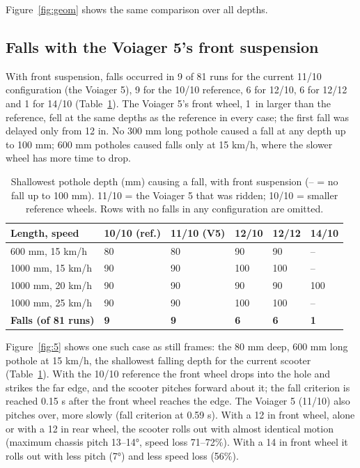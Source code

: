 Figure~\ref{fig:geom} shows the same comparison over all depths.

\subsection{Falls with the Voiager 5's front suspension}\label{falls-with-the-voiager-5s-front-suspension}


With front suspension, falls occurred in 9 of 81 runs for the current 11/10
configuration (the Voiager 5), 9 for the 10/10 reference, 6 for 12/10, 6 for 12/12 and 1
for 14/10 (Table~\ref{tab:7}). The Voiager 5's front wheel, 1~in larger than the reference,
fell at the same depths as the reference in every case; the first fall was delayed only
from 12 in. No 300 mm long pothole caused a fall at any depth up to 100 mm; 600 mm
potholes caused falls only at 15 km/h, where the slower wheel has more time to drop.

\begin{table}[htbp]
\centering
\caption{Shallowest pothole depth (mm) causing a fall, with front suspension (-- = no fall up to 100 mm). 11/10 = the Voiager 5 that was ridden; 10/10 = smaller reference wheels. Rows with no falls in any configuration are omitted.}\label{tab:7}
\begin{tabular}{@{}llllll@{}}
\toprule
Length, speed & 10/10 (ref.) & 11/10 (V5) & 12/10 & 12/12 & 14/10 \\
\midrule
600 mm, 15 km/h & 80 & 80 & 90 & 90 & -- \\
1000 mm, 15 km/h & 90 & 90 & 100 & 100 & -- \\
1000 mm, 20 km/h & 90 & 90 & 90 & 90 & 100 \\
1000 mm, 25 km/h & 90 & 90 & 100 & 100 & -- \\
\textbf{Falls (of 81 runs)} & \textbf{9} & \textbf{9} & \textbf{6} & \textbf{6} & \textbf{1} \\
\bottomrule
\end{tabular}
\end{table}


Figure~\ref{fig:5} shows one such case as still frames: the 80 mm deep, 600 mm long pothole at
15 km/h, the shallowest falling depth for the current scooter (Table~\ref{tab:7}). With the
10/10 reference the front wheel drops into the hole and strikes the far edge, and the
scooter pitches forward about it; the fall criterion is reached 0.15 s after the front
wheel reaches the edge. The Voiager 5 (11/10) also pitches over, more slowly (fall
criterion at 0.59 s). With a 12 in front wheel, alone or with a 12 in rear wheel, the
scooter rolls out with almost identical motion (maximum chassis pitch 13--14°, speed loss
71--72\%). With a 14 in front wheel it rolls out with less pitch (7°) and less speed loss
(56\%).

